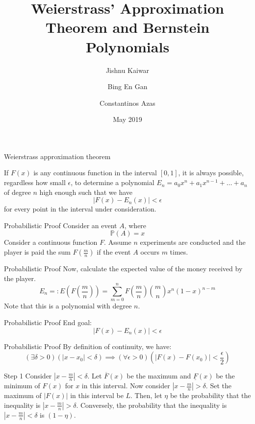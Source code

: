\documentclass{beamer}
\title{Weierstrass' Approximation Theorem and Bernstein Polynomials}
\author{Jishnu Kaiwar
  \and
  Bing En Gan
  \and
  Constantinos Azas}
\date{May 2019}
\begin{document}
\frame{\titlepage}

\begin{frame}{Weierstrass approximation theorem}
\begin{theorem}
If $F(x)$ is any continuous function in the interval $[0,1]$, it is always possible, regardless how small $\epsilon$, to determine a polynomial $E_n=a_0x^n+a_1x^{n-1}+\dots+a_n$ of degree $n$ high enough such that we have
\begin{equation*}
    |F(x)-E_n(x)|<\epsilon
\end{equation*}
for every point in the interval under consideration.
\end{theorem}
\end{frame}

\begin{frame}{Probabilistic Proof}
Consider an event $A$, where
$$\mathbb{P}(A)=x$$
Consider a continuous function $F$.
\newline 
Assume $n$ experiments are conducted and the player is paid the sum $F(\frac{m}{n})$ if the event $A$ occurs $m$ times.    
\end{frame}

\begin{frame}{Probabilistic Proof}
Now, calculate the expected value of the money received by the player.
\begin{equation*}
      E_n =:E(F(\frac{m}{n})) = \sum_{m=0}^{n} F \left( \frac{m}{n} \right) \binom{m}{n} x^n (1-x)^{n-m}
\end{equation*}
Note that this is a polynomial with degree $n$.
\end{frame}

\begin{frame}{Probabilistic Proof}
End goal:
\begin{equation*}
    |F(x)-E_n(x)|<\epsilon
\end{equation*}
\end{frame}

\begin{frame}{Probabilistic Proof}
By definition of continuity, we have:
\begin{equation*}
    (\exists\delta>0)(|x-x_0|<\delta)\implies(\forall\epsilon>0)(|F(x)-F(x_0)|<\frac{\epsilon}{2})
\end{equation*}
\end{frame}

\begin{frame}{Step 1}
Consider $|x-\frac{m}{n}|<\delta$.
\newline
Let $\overline{F}(x)$ be the maximum and $\underline{F}(x)$ be the minimum of $F(x)$ for $x$ in this interval.
\newline
Now consider $|x-\frac{m}{n}|>\delta$.
\newline
Set the maximum of $|F(x)|$ in this interval be $L$.
\newline
Then, let $\eta$ be the probability that the inequality is $|x-\frac{m}{n}|>\delta$. Conversely, the probability that the inequality is $|x-\frac{m}{n}|<\delta$ is $(1-\eta)$.
\end{frame}
\end{document}
